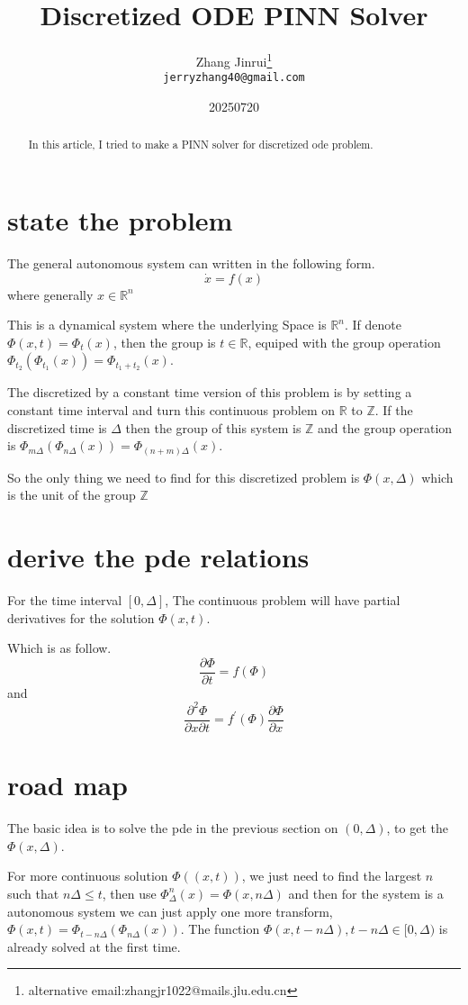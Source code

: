 \documentclass{article}
\title{Discretized ODE PINN Solver}
\author{
Zhang Jinrui\thanks{alternative email:zhangjr1022@mails.jlu.edu.cn} \\ \texttt{jerryzhang40@gmail.com}
}
\date{20250720}  %
\theoremstyle{definition} %
\begin{document}
\maketitle

\begin{abstract}
    In this article, I tried to make
    a PINN\cite{raissi2017physics} solver for discretized
    ode problem.
\end{abstract}

\section{state the problem}
The general autonomous system can written
in the following form.
\[
    \dot{x}=f(x)
\]
where generally \(x\in\mathbb{R}^n\)

This is a dynamical system where the
underlying Space is \(\mathbb{R}^n\).
If denote \(\Phi(x,t)=\Phi_t(x)\),
then the group is \(t\in\mathbb{R}\),
equiped with the group operation
\(\Phi_{t_2}(\Phi_{t_1}(x))=\Phi_{t_1+t_2}(x)\).

The discretized by a constant time
version of this problem is by setting a
constant time interval and turn this
continuous problem on \(\mathbb{R}\)
to \(\mathbb{Z}\).
If the discretized time is \(\Delta\)
then the group of this system is
\(\mathbb{Z}\) and the group operation
is
\(\Phi_{m\Delta}(\Phi_{n\Delta}(x))
=
\Phi_{(n+m)\Delta}(x)\).

So the only thing we need to find
for this discretized problem is
\(\Phi(x,\Delta)\) which is the
unit of the group \(\mathbb{Z}\)

\section{derive the pde relations}
For the time interval \([0,\Delta]\),
The continuous problem will have
partial derivatives for the solution
\(\Phi(x,t)\).

Which is as follow.
\[
    \frac{\partial\Phi}{\partial t}=f(\Phi)
\]
and
\[
    \frac{\partial^2\Phi}{\partial x\partial t}
    =
    f^\prime(\Phi)\frac{\partial\Phi}{\partial x}
\]

\section{road map}
The basic idea is to solve the pde in the
previous section on \((0,\Delta)\),
to get the \(\Phi(x,\Delta)\).

For more continuous solution
\(\Phi((x,t))\), we just need to find the
largest \(n\) such that \(n\Delta\leq t\),
then use \(\Phi^n_\Delta(x)=\Phi(x,n\Delta)\)
and then for the system is a autonomous system
we can just apply one more transform,
\(\Phi(x,t)=\Phi_{t-n\Delta}(\Phi_{n\Delta}(x))\).
The function \(\Phi(x,t-n\Delta),t-n\Delta\in[0,\Delta)\)
is already solved at the first time.
\end{document}
